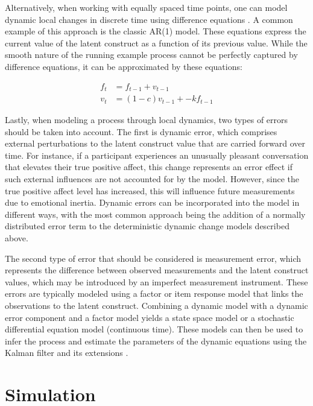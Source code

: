 \documentclass[man, floatsintext]{apa7}
\begin{document}
Alternatively, when working with equally spaced time points, one can model
dynamic local changes in discrete time using difference equations
\parencite{durbin_time_2012}. A common example of this approach is the classic
AR(1) model. These equations express the current value of the latent construct
as a function of its previous value. While the smooth nature of the running
example process cannot be perfectly captured by difference equations, it can be
approximated by these equations:

\begin{equation}
  \begin{aligned}
    f_{t} & = f_{t-1} + v_{t-1}        \\
    v_{t} & = (1-c)v_{t-1} + -kf_{t-1}
  \end{aligned}
\end{equation}

Lastly, when modeling a process through local dynamics, two types of errors
should be taken into account. The first is dynamic error, which comprises
external perturbations
to the latent construct value that are carried forward over time. For instance,
if a participant experiences an unusually pleasant conversation that elevates
their true positive affect, this change represents an error effect if such
external influences are not accounted for by the model. However, since the true
positive affect level has increased, this will influence future measurements
due to emotional inertia. Dynamic errors can be incorporated into the model in
different ways, with the most common approach being the addition of a normally
distributed error term to the deterministic dynamic change models described
above.

The second type of error that should be considered is measurement error,
which represents the difference between observed measurements and the
latent construct values, which may be introduced by an imperfect measurement
instrument. These errors are typically
modeled using a factor or item response model that links the observations to
the latent construct. Combining a dynamic model with a dynamic error component
and a factor model yields a state space model \parencite[discrete
  time;][]{durbin_time_2012} or a stochastic differential equation model
(continuous time). These models can then be used to infer the process and
estimate the parameters of the dynamic equations using the Kalman filter and
its extensions \parencite{chow_unscented_2007}.

\section{Simulation}
\end{document}
